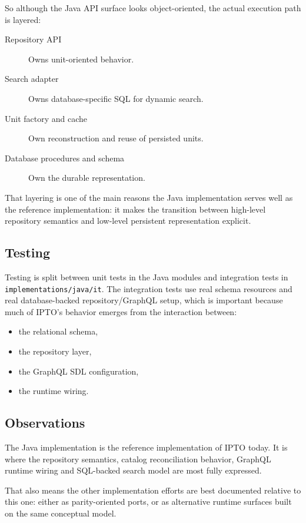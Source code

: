 So although the Java API surface looks object-oriented, the actual execution path is layered:
\begin{description}
\item[Repository API] Owns unit-oriented behavior.
\vspace{.2cm}
\item[Search adapter] Owns database-specific SQL for dynamic search.
\vspace{.2cm}
\item[Unit factory and cache] Own reconstruction and reuse of persisted units.
\vspace{.2cm}
\item[Database procedures and schema] Own the durable representation.
\end{description}

That layering is one of the main reasons the Java implementation serves well as the reference implementation: it makes the transition between high-level repository semantics and low-level persistent representation explicit.

\subsection{Testing}

Testing is split between unit tests in the Java modules and integration tests in \texttt{implementations/java/it}. The integration tests use real schema resources and real database-backed repository/GraphQL setup, which is important because much of IPTO's behavior emerges from the interaction between:
\begin{itemize}
\item the relational schema,
\item the repository layer,
\item the GraphQL SDL configuration,
\item the runtime wiring.
\end{itemize}

\subsection{Observations}

The Java implementation is the reference implementation of IPTO today. It is where the repository semantics, catalog reconciliation behavior, GraphQL runtime wiring and SQL-backed search model are most fully expressed.

That also means the other implementation efforts are best documented relative to this one: either as parity-oriented ports, or as alternative runtime surfaces built on the same conceptual model.
